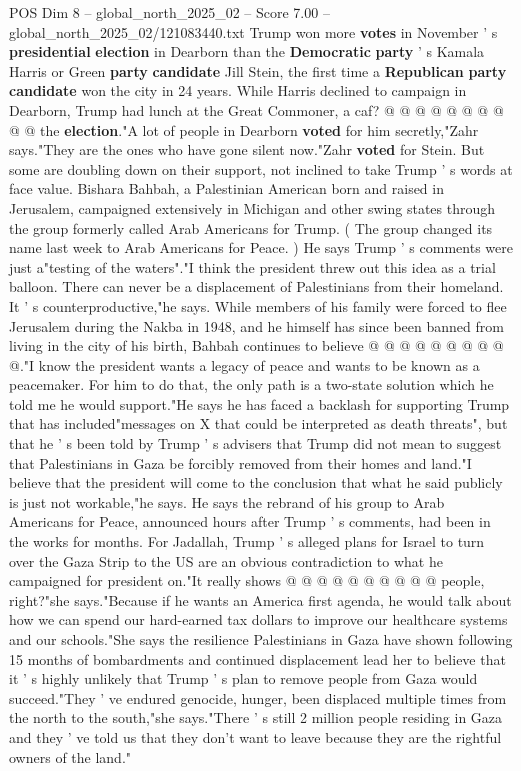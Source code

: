 \begin{textsample}{POS Dim 8 – global\_north\_2025\_02 – Score 7.00 – global\_north\_2025\_02/121083440.txt}
Trump won more \textbf{votes} in November ' s \textbf{presidential} \textbf{election} in Dearborn than the \textbf{Democratic} \textbf{party} ' s Kamala Harris or Green \textbf{party} \textbf{candidate} Jill Stein, the first time a \textbf{Republican} \textbf{party} \textbf{candidate} won the city in 24 years.
While Harris declined to campaign in Dearborn, Trump had lunch at the Great Commoner, a caf? @ @ @ @ @ @ @ @ @ @ the \textbf{election}."A lot of people in Dearborn \textbf{voted} for him secretly,"Zahr says."They are the ones who have gone silent now."Zahr \textbf{voted} for Stein.
But some are doubling down on their support, not inclined to take Trump ' s words at face value.
Bishara Bahbah, a Palestinian American born and raised in Jerusalem, campaigned extensively in Michigan and other swing states through the group formerly called Arab Americans for Trump. ( The group changed its name last week to Arab Americans for Peace. ) He says Trump ' s comments were just a"testing of the waters"."I think the president threw out this idea as a trial balloon.
There can never be a displacement of Palestinians from their homeland.
It ' s counterproductive,"he says.
While members of his family were forced to flee Jerusalem during the Nakba in 1948, and he himself has since been banned from living in the city of his birth, Bahbah continues to believe @ @ @ @ @ @ @ @ @ @."I know the president wants a legacy of peace and wants to be known as a peacemaker.
For him to do that, the only path is a two-state solution which he told me he would support."He says he has faced a backlash for supporting Trump that has included"messages on X that could be interpreted as death threats", but that he ' s been told by Trump ' s advisers that Trump did not mean to suggest that Palestinians in Gaza be forcibly removed from their homes and land."I believe that the president will come to the conclusion that what he said publicly is just not workable,"he says.
He says the rebrand of his group to Arab Americans for Peace, announced hours after Trump ' s comments, had been in the works for months.
For Jadallah, Trump ' s alleged plans for Israel to turn over the Gaza Strip to the US are an obvious contradiction to what he campaigned for president on."It really shows @ @ @ @ @ @ @ @ @ @ people, right?"she says."Because if he wants an America first agenda, he would talk about how we can spend our hard-earned tax dollars to improve our healthcare systems and our schools."She says the resilience Palestinians in Gaza have shown following 15 months of bombardments and continued displacement lead her to believe that it ' s highly unlikely that Trump ' s plan to remove people from Gaza would succeed."They ' ve endured genocide, hunger, been displaced multiple times from the north to the south,"she says."There ' s still 2 million people residing in Gaza and they ' ve told us that they don't want to leave because they are the rightful owners of the land."

\end{textsample}
